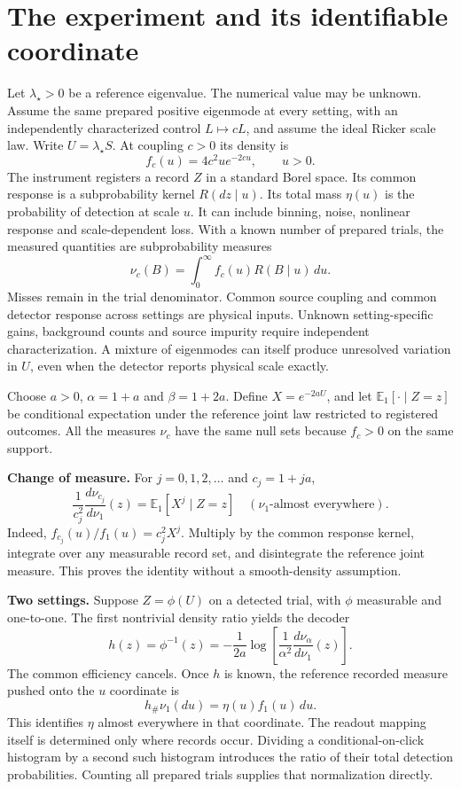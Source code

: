 \section{The experiment and its identifiable coordinate}
Let $\lambda_\star>0$ be a reference eigenvalue. The numerical value may be unknown. Assume the same prepared positive eigenmode at every setting, with an independently characterized control $L\mapsto cL$, and assume the ideal Ricker scale law. Write $U=\lambda_\star S$. At coupling $c>0$ its density is
\[
 f_c(u)=4c^2u e^{-2cu},\qquad u>0.
\]
The instrument registers a record $Z$ in a standard Borel space. Its common response is a subprobability kernel $R(dz\mid u)$. Its total mass $\eta(u)$ is the probability of detection at scale $u$. It can include binning, noise, nonlinear response and scale-dependent loss. With a known number of prepared trials, the measured quantities are subprobability measures
\[
 \nu_c(B)=\int_0^\infty f_c(u)R(B\mid u)\,du.
\]
Misses remain in the trial denominator. Common source coupling and common detector response across settings are physical inputs. Unknown setting-specific gains, background counts and source impurity require independent characterization. A mixture of eigenmodes can itself produce unresolved variation in $U$, even when the detector reports physical scale exactly.

Choose $a>0$, $\alpha=1+a$ and $\beta=1+2a$. Define $X=e^{-2aU}$, and let $\mathbb E_1[\cdot\mid Z=z]$ be conditional expectation under the reference joint law restricted to registered outcomes. All the measures $\nu_c$ have the same null sets because $f_c>0$ on the same support.

\textbf{Change of measure.} For $j=0,1,2,\ldots$ and $c_j=1+ja$,
\[
 \frac1{c_j^2}\frac{d\nu_{c_j}}{d\nu_1}(z)=\mathbb E_1[X^j\mid Z=z]
 \quad (\nu_1\text{-almost everywhere}).
\]
Indeed, $f_{c_j}(u)/f_1(u)=c_j^2X^j$. Multiply by the common response kernel, integrate over any measurable record set, and disintegrate the reference joint measure. This proves the identity without a smooth-density assumption.

\textbf{Two settings.} Suppose $Z=\phi(U)$ on a detected trial, with $\phi$ measurable and one-to-one. The first nontrivial density ratio yields the decoder
\[
 h(z)=\phi^{-1}(z)=-\frac1{2a}\log\!\left[\frac1{\alpha^2}\frac{d\nu_\alpha}{d\nu_1}(z)\right].
\]
The common efficiency cancels. Once $h$ is known, the reference recorded measure pushed onto the $u$ coordinate is
\[
 h_\#\nu_1(du)=\eta(u) f_1(u)\,du.
\]
This identifies $\eta$ almost everywhere in that coordinate. The readout mapping itself is determined only where records occur. Dividing a conditional-on-click histogram by a second such histogram introduces the ratio of their total detection probabilities. Counting all prepared trials supplies that normalization directly.

